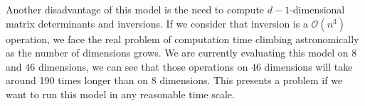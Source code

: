 Another disadvantage of this model is the need to compute $d-1$-dimensional matrix determinants
  and inversions.  If we consider that inversion is a $\mathcal{O}(n^3)$ operation, we face the real
  problem of computation time climbing astronomically as the number of dimensions grows.  We are
  currently evaluating this model on 8 and 46 dimensions, we can see that those operations on 46
  dimensions will take around 190 times longer than on 8 dimensions.  This presents a problem if we
  want to run this model in any reasonable time scale.
